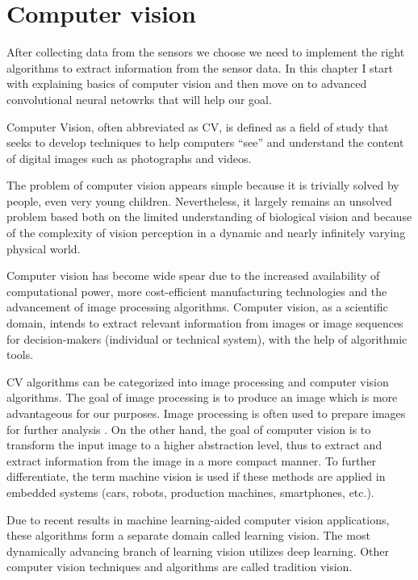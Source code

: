 \chapter{Computer vision}
\label{chap:perceptions}

After collecting data from the sensors we choose we need to implement the right
algorithms to extract information from the sensor data. In this chapter I start
with explaining basics of computer vision and then move on to advanced
convolutional neural netowrks that will help our goal.

Computer Vision, often abbreviated as CV, is defined as a field of study that
seeks to develop techniques to help computers “see” and understand the content
of digital images such as photographs and videos.

The problem of computer vision appears simple because it is trivially solved by
people, even very young children. Nevertheless, it largely remains an unsolved
problem based both on the limited understanding of biological vision and because
of the complexity of vision perception in a dynamic and nearly infinitely
varying physical world.

Computer vision has become wide spear due to the increased availability of
computational power, more cost-efficient manufacturing technologies and the
advancement of image processing algorithms. Computer vision, as a scientific
domain, intends to extract relevant information from images or image sequences
for decision-makers (individual or technical system), with the help of
algorithmic tools. 

CV algorithms can be categorized into image processing and computer vision
algorithms. The goal of image processing is to produce an image which is more
advantageous for our purposes. Image processing is often used to prepare images
for further analysis . On the other hand, the goal of computer vision is to
transform the input image to a higher abstraction level, thus to extract and
extract information from the image in a more compact manner. To further
differentiate, the term machine vision is used if these methods are applied in
embedded systems (cars, robots, production machines, smartphones, etc.).

Due to recent results in machine learning-aided computer vision applications,
these algorithms form a separate domain called learning vision. The most
dynamically advancing branch of learning vision utilizes deep learning. Other
computer vision techniques and algorithms are called tradition vision.

